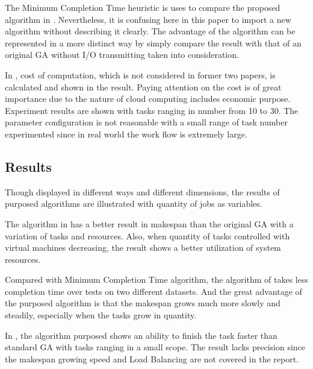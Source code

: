 \documentclass[10pt,twoside,openright,logo]{report}
\begin{document}
The Minimum Completion Time heuristic is uses to compare the proposed algorithm in \cite{2}. Nevertheless, it is confusing here in this paper to import a new algorithm without describing it clearly. The advantage of the algorithm can be represented in a more distinct way by simply compare the result with that of an original GA without I/O transmitting taken into consideration.

In \cite{3}, cost of computation, which is not considered in former two papers, is calculated and shown in the result. Paying attention on the cost is of great importance due to the nature of cloud computing includes economic purpose. Experiment results are shown with tasks ranging in number from 10 to 30. The parameter configuration is not reasonable with a small range of task number experimented since in real world the work flow is extremely large.

\subsection{Results}
Though displayed in different ways and different dimensions, the results of purposed algorithms are illustrated with quantity of jobs as variables.

The algorithm in \cite{1} has a better result in makespan than the original GA with a variation of tasks and resources. Also, when quantity of tasks controlled with virtual machines decreasing, the result shows a better utilization of system resources.

Compared with Minimum Completion Time algorithm, the algorithm of \cite{2} takes less completion time over tests on two different datasets. And the great advantage of the purposed algorithm is that the makespan grows much more slowly and steadily, especially when the tasks grow in quantity.

In \cite{3}, the algorithm purposed shows an ability to finish the task faster than standard GA with tasks ranging in a small scope. The result lacks precision since the makespan growing speed and Load Balancing are not covered in the report.
\end{document}
